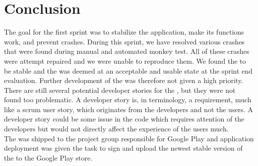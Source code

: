 
\chapter{Conclusion}
\label{cha:conclusion}

The goal for the first sprint was to stabilize the \launcher application, make its functions work, and prevent crashes. During this sprint, we have resolved various crashes that were found during manual and automated monkey test. All of these crashes were attempt repaired and we were unable to reproduce them. We found the \launcher to be stable and the \launcher was deemed at an acceptable and usable state at the sprint end evaluation. Further development of the \launcher was therefore not given a high priority. \\

There are still several potential developer stories for the \launcher, but they were not found too problematic. A developer story is, in \giraf terminology, a requirement, much like a scrum user story, which originates from the developers and not the users. A developer story could be some issue in the code which requires attention of the developers but would not directly affect the experience of the users much.\\    

The \launcher was shipped to the project group responsible for Google Play and application deployment was given the task to sign and upload the newest stable version of the \launcher to the Google Play store. 






